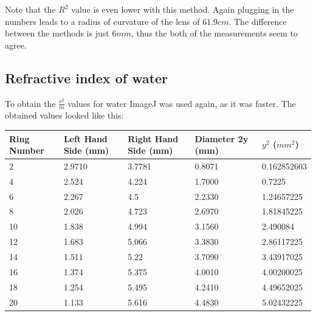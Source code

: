 \documentclass[12pt]{article}
\begin{document}
Note that the $R^2$ value is even lower with this method. Again plugging in the numbers leads to a radius of curvature of the lens of $61.9cm$. 
The difference between the methods is just $6 mm$, thus the both of the measurements seem to agree.

\subsection{Refractive index of water}

To obtain the $\frac{r^2}{m}$ values for water ImageJ was used again, as it was faster. The obtained
values looked like this:

\begin{table}[H]
  \begin{tabular}{lllll}
  Ring Number & Left Hand Side (mm) & Right Hand Side (mm) & Diameter 2y (mm) & $y^2$ ($mm^2$) \\
  \hline
  2           & 2.9710              & 3.7781               & 0.8071           & 0.162852603                                  \\
  4           & 2.524               & 4.224                & 1.7000           & 0.7225                                       \\
  6           & 2.267               & 4.5                  & 2.2330           & 1.24657225                                   \\
  8           & 2.026               & 4.723                & 2.6970           & 1.81845225                                   \\
  10          & 1.838               & 4.994                & 3.1560           & 2.490084                                     \\
  12          & 1.683               & 5.066                & 3.3830           & 2.86117225                                   \\
  14          & 1.511               & 5.22                 & 3.7090           & 3.43917025                                   \\
  16          & 1.374               & 5.375                & 4.0010           & 4.00200025                                   \\
  18          & 1.254               & 5.495                & 4.2410           & 4.49652025                                   \\
  20          & 1.133               & 5.616                & 4.4830           & 5.02432225                                   \\
  \end{tabular}
\end{table}
\end{document}

